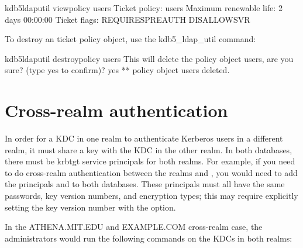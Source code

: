 \documentclass[letterpaper,10pt,english]{sphinxmanual}
\begin{document}
%
\begin{sphinxVerbatim}[commandchars=\\\{\}]
\PYGZdl{} kdb5\PYGZus{}ldap\PYGZus{}util view\PYGZus{}policy users
            Ticket policy: users
   Maximum renewable life: 2 days 00:00:00
             Ticket flags: REQUIRES\PYGZus{}PRE\PYGZus{}AUTH DISALLOW\PYGZus{}SVR
\end{sphinxVerbatim}

To destroy an ticket policy object, use the kdb5\_ldap\_util
 command:

%
\begin{sphinxVerbatim}[commandchars=\\\{\}]
\PYGZdl{} kdb5\PYGZus{}ldap\PYGZus{}util destroy\PYGZus{}policy users
This will delete the policy object \PYGZsq{}users\PYGZsq{}, are you sure?
(type \PYGZsq{}yes\PYGZsq{} to confirm)? yes
** policy object \PYGZsq{}users\PYGZsq{} deleted.
\end{sphinxVerbatim}


\section{Cross-realm authentication}
\label{\detokenize{admin/database:cross-realm-authentication}}\label{\detokenize{admin/database:xrealm-authn}}
In order for a KDC in one realm to authenticate Kerberos users in a
different realm, it must share a key with the KDC in the other realm.
In both databases, there must be krbtgt service principals for both realms.
For example, if you need to do cross-realm authentication between the realms
 and , you would need to add the
principals  and
 to both databases.
These principals must all have the same passwords, key version
numbers, and encryption types; this may require explicitly setting
the key version number with the  option.

In the ATHENA.MIT.EDU and EXAMPLE.COM cross-realm case, the administrators
would run the following commands on the KDCs in both realms:
\end{document}
